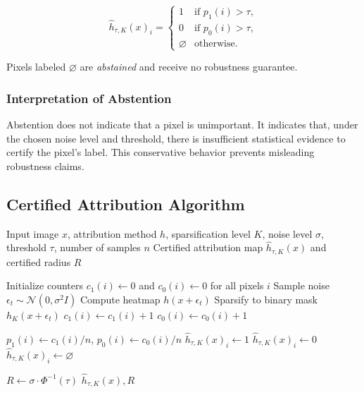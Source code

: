 \documentclass[11pt]{article}
\begin{document}
$$
\hat{h}_{\tau,K}(x)_i =
\begin{cases}
1 & \text{if } p_1(i) > \tau, \\
0 & \text{if } p_0(i) > \tau, \\
\varnothing & \text{otherwise}.
\end{cases}
$$

Pixels labeled $\varnothing$ are \emph{abstained} and receive no robustness guarantee.

\subsubsection{Interpretation of Abstention}
Abstention does not indicate that a pixel is unimportant.
It indicates that, under the chosen noise level and threshold,
there is insufficient statistical evidence to certify the pixel’s label.
This conservative behavior prevents misleading robustness claims.


\subsection{Certified Attribution Algorithm}


\begin{algorithm}[H]
\caption{Pixel-level Certified Attribution}
\label{alg:pixel_cert}
\begin{algorithmic}[1]
\REQUIRE Input image $x$, attribution method $h$, sparsification level $K$, noise level $\sigma$, threshold $\tau$, number of samples $n$
\ENSURE Certified attribution map $\hat{h}_{\tau,K}(x)$ and certified radius $R$

\STATE Initialize counters $c_1(i) \gets 0$ and $c_0(i) \gets 0$ for all pixels $i$
  \STATE Sample noise $\epsilon_t \sim \mathcal{N}(0,\sigma^2 I)$
  \STATE Compute heatmap $h(x+\epsilon_t)$
  \STATE Sparsify to binary mask $h_K(x+\epsilon_t)$
      \STATE $c_1(i) \gets c_1(i) + 1$
    \ELSE
      \STATE $c_0(i) \gets c_0(i) + 1$
    \ENDIF
  \ENDFOR
\ENDFOR

  \STATE $p_1(i) \gets c_1(i)/n$, \quad $p_0(i) \gets c_0(i)/n$
    \STATE $\hat{h}_{\tau,K}(x)_i \gets 1$
    \STATE $\hat{h}_{\tau,K}(x)_i \gets 0$
  \ELSE
    \STATE $\hat{h}_{\tau,K}(x)_i \gets \varnothing$
  \ENDIF
\ENDFOR

\STATE $R \gets \sigma \cdot \Phi^{-1}(\tau)$
\RETURN $\hat{h}_{\tau,K}(x), R$
\end{algorithmic}
\end{algorithm}
\end{document}
